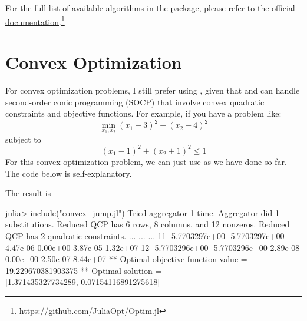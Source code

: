 For the full list of available algorithms in the  package, please refer to the \href{https://github.com/JuliaOpt/Optim.jl}{official documentation}.\footnote{\url{https://github.com/JuliaOpt/Optim.jl}}




%
%





\section{Convex Optimization}

For convex optimization problems, I still prefer using \jump{}, given that \cplex{} and \gurobi{} can handle second-order conic programming (SOCP) that involve convex quadratic constraints and objective functions. For example, if you have a problem like:
\begin{equation*}
    \min_{x_1, x_2} (x_1-3)^2 + (x_2-4)^2
\end{equation*}
subject to
\begin{equation*}
    (x_1-1)^2+(x_2+1)^2 \leq 1
\end{equation*}
For this convex optimization problem, we can just use \jump{} as we have done so far. The code below is self-explanatory.
\begin{codelisting}
\end{codelisting}
\noindent The result is
\begin{code}
julia> include("convex_jump.jl")
Tried aggregator 1 time.
Aggregator did 1 substitutions.
Reduced QCP has 6 rows, 8 columns, and 12 nonzeros.
Reduced QCP has 2 quadratic constraints.
...
...
...
  11  -5.7703297e+00  -5.7703297e+00  4.47e-06  0.00e+00  3.87e-05  1.32e+07
  12  -5.7703296e+00  -5.7703296e+00  2.89e-08  0.00e+00  2.50e-07  8.44e+07
** Optimal objective function value = 19.229670381903375
** Optimal solution = [1.371435327734289,-0.07154116891275618]
\end{code}


